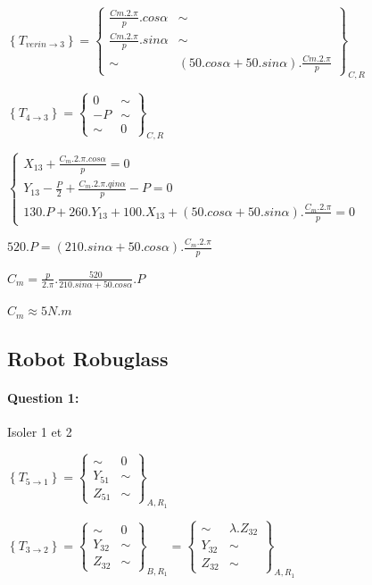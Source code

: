 $\left\{T_{verin \rightarrow 3}\right\}=\left\{
\begin{array}{cc}
\frac{Cm.2.\pi}{p}.cos\alpha & \sim \\
\frac{Cm.2.\pi}{p}.sin\alpha & \sim \\
\sim & (50.cos\alpha+50.sin\alpha).\frac{Cm.2.\pi}{p}
\end{array}
\right\}_{C,R}$

$\left\{T_{4\rightarrow 3}\right\}=\left\{
\begin{array}{cc}
0 & \sim \\
-P & \sim \\
\sim & 0
\end{array}
\right\}_{C,R}$

$\left\{\begin{array}{l}
X_{13}+\frac{C_m.2.\pi.cos\alpha}{p}=0 \\
Y_{13}-\frac{P}{2}+\frac{C_m.2.\pi.qin\alpha}{p}-P=0 \\
130.P+260.Y_{13}+100.X_{13}+(50.cos\alpha+50.sin\alpha).\frac{C_m.2.\pi}{p}=0
\end{array}\right.$

$520.P=(210.sin\alpha+50.cos\alpha).\frac{C_m.2.\pi}{p}$

$C_m=\frac{p}{2.\pi}.\frac{520}{210.sin\alpha+50.cos\alpha}.P$

$C_m\approx 5N.m$

\subsection{Robot Robuglass}

\paragraph{Question 1:}

Isoler 1 et 2

$\left\{T_{5\rightarrow 1}\right\}=\left\{
\begin{array}{cc}
\sim & 0 \\
Y_{51} & \sim \\
Z_{51} & \sim
\end{array}
\right\}_{A,R_1}$

$\left\{T_{3\rightarrow 2}\right\}=\left\{
\begin{array}{cc}
\sim & 0 \\
Y_{32} & \sim \\
Z_{32} & \sim
\end{array}
\right\}_{B,R_1}=\left\{
\begin{array}{cc}
\sim & \lambda.Z_{32} \\
Y_{32} & \sim \\
Z_{32} & \sim
\end{array}
\right\}_{A,R_1}$

